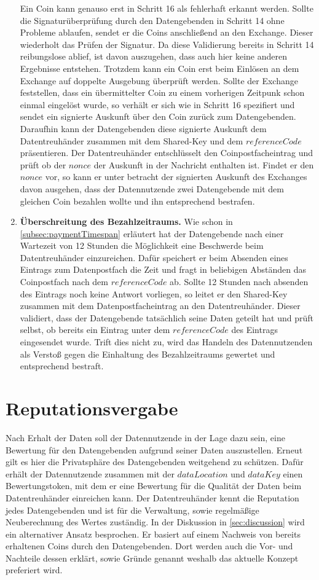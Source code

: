 \documentclass[
	fontsize=12pt,
	headings=small,
	parskip=half,           %
	bibliography=totoc,
	numbers=noenddot,       %
	open=any,               %
]{scrreprt}
\begin{document}
\begin{enumerate}
    Ein Coin kann genauso erst in Schritt 16 als fehlerhaft erkannt werden. Sollte die Signaturüberprüfung durch den Datengebenden in Schritt 14 ohne Probleme ablaufen, sendet er die Coins anschließend an den Exchange. Dieser wiederholt das Prüfen der Signatur. Da diese Validierung bereits in Schritt 14 reibungslose ablief, ist davon auszugehen, dass auch hier keine anderen Ergebnisse entstehen. Trotzdem kann ein Coin erst beim Einlösen an dem Exchange auf doppelte Ausgebung überprüft werden. Sollte der Exchange feststellen, dass ein übermittelter Coin zu einem vorherigen Zeitpunk schon einmal eingelöst wurde, so verhält er sich wie in Schritt 16 spezifiert und sendet ein signierte Auskunft über den Coin zurück zum Datengebenden. Daraufhin kann der Datengebenden diese signierte Auskunft dem Datentreuhänder zusammen mit dem Shared-Key und dem $referenceCode$ präsentieren. Der Datentreuhänder entschlüsselt den Coinpostfacheintrag und prüft ob der $nonce$ der Auskunft in der Nachricht enthalten ist. Findet er den $nonce$ vor, so kann er unter betracht der signierten Auskunft des Exchanges davon ausgehen, dass der Datennutzende zwei Datengebende mit dem gleichen Coin bezahlen wollte und ihn entsprechend bestrafen.

    \item \textbf{Überschreitung des Bezahlzeitraums.} \label{case:paymentExceeded}
    Wie schon in \ref{subsec:paymentTimespan} erläutert hat der Datengebende nach einer Wartezeit von 12 Stunden die Möglichkeit eine Beschwerde beim Datentreuhänder einzureichen. Dafür speichert er beim Absenden eines Eintrags zum Datenpostfach die Zeit und fragt in beliebigen Abständen das Coinpostfach nach dem $referenceCode$ ab. Sollte 12 Stunden nach absenden des Eintrags noch keine Antwort vorliegen, so leitet er den Shared-Key zusammen mit dem Datenpostfacheintrag an den Datentreuhänder. Dieser validiert, dass der Datengebende tatsächlich seine Daten geteilt hat und prüft selbst, ob bereits ein Eintrag unter dem $referenceCode$ des Eintrags eingesendet wurde. Trift dies nicht zu, wird das Handeln des Datennutzenden als Verstoß gegen die Einhaltung des Bezahlzeitraums gewertet und entsprechend bestraft.
\end{enumerate}


\section{Reputationsvergabe}
Nach Erhalt der Daten soll der Datennutzende in der Lage dazu sein, eine Bewertung für den Datengebenden aufgrund seiner Daten auszustellen. Erneut gilt es hier die Privatsphäre des Datengebenden weitgehend zu schützen. Dafür erhält der Datennutzende zusammen mit der $dataLocation$ und $dataKey$ einen Bewertungstoken, mit dem er eine Bewertung für die Qualität der Daten beim Datentreuhänder einreichen kann. Der Datentreuhänder kennt die Reputation jedes Datengebenden und ist für die Verwaltung, sowie regelmäßige Neuberechnung des Wertes zuständig.
In der Diskussion in \ref{sec:discussion} wird ein alternativer Ansatz besprochen. Er basiert auf einem Nachweis von bereits erhaltenen Coins durch den Datengebenden. Dort werden auch die Vor- und Nachteile dessen erklärt, sowie Gründe genannt weshalb das aktuelle Konzept preferiert wird.
\label{system:reputation}
\end{document}
